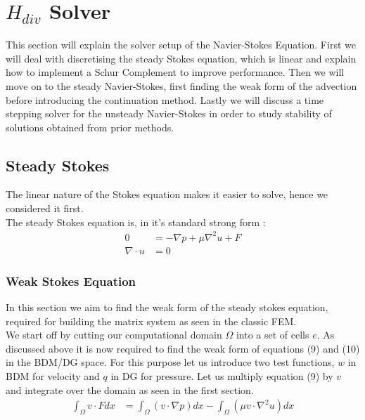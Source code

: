 \documentclass[11pt,twoside,a4paper]{article}
\begin{document}
\section{$H_{div}$ Solver}
This section will explain the solver setup of the Navier-Stokes Equation. First we will deal with discretising the steady Stokes equation, which is linear and explain how to implement a Schur Complement to improve performance. Then we will move on to the steady Navier-Stokes, first finding the weak form of the advection before introducing the continuation method. Lastly we will discuss a time stepping solver for the unsteady Navier-Stokes in order to study stability of solutions obtained from prior methods.
\subsection{Steady Stokes}
The linear nature of the Stokes equation makes it easier to solve, hence we considered it first.\\
The steady Stokes equation is, in it's standard strong form :
\begin{align}
0 &= -\nabla p + \mu \nabla^2 u + F  \\
\nabla \cdot u &= 0
\end{align}

\subsubsection{Weak Stokes Equation}
In this section we aim to find the weak form of the steady stokes equation, required for building the matrix system as seen in the classic FEM.\\
We start off by cutting our computational domain $\Omega$ into a set of cells $e$. As discussed above it is now required to find the weak form of equations (9) and (10) in the BDM/DG space.
For this purpose let us introduce two test functions, $w$ in BDM for velocity and $q$ in DG for pressure.
Let us multiply equation (9) by $v$ and integrate over the domain as seen in the first section.
\begin{align*}
\int_\Omega v \cdot F dx &= \int_\Omega (v \cdot \nabla p) dx - \int_\Omega (\mu v \cdot \nabla^2 u) dx
\end{align*}
\end{document}
